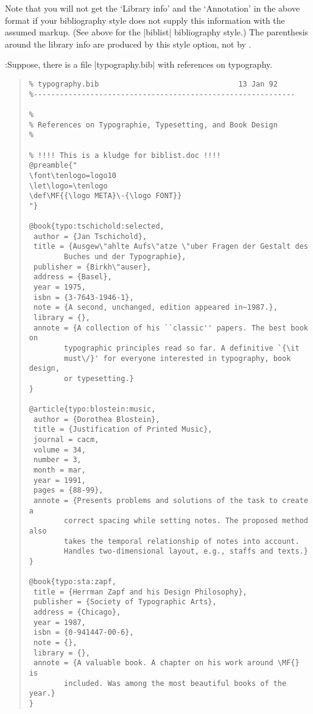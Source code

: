 Note that you will not get the `Library info' and the `Annotation' in
the above format if your bibliography style does not supply this
information with the assumed markup. (See above for the |biblist|
bibliography style.) The parenthesis around the library info are
produced by this style option, not by \BibTeX{}.


:\quad Suppose, there is a file |typography.bib|
with references on typography.
%
 \begin{quote}
\begin{verbatim}
% typography.bib                                13 Jan 92
%------------------------------------------------------------

%
% References on Typographie, Typesetting, and Book Design
%

% !!!! This is a kludge for biblist.doc !!!!
@preamble{"
\font\tenlogo=logo10
\let\logo=\tenlogo
\def\MF{{\logo META}\-{\logo FONT}}
"}

@book{typo:tschichold:selected,
 author = {Jan Tschichold},
 title = {Ausgew\"ahlte Aufs\"atze \"uber Fragen der Gestalt des
        Buches und der Typographie},
 publisher = {Birkh\"auser},
 address = {Basel},
 year = 1975,
 isbn = {3-7643-1946-1},
 note = {A second, unchanged, edition appeared in~1987.},
 library = {},
 annote = {A collection of his ``classic'' papers. The best book on
        typographic principles read so far. A definitive `{\it
        must\/}' for everyone interested in typography, book design,
        or typesetting.}
}

@article{typo:blostein:music,
 author = {Dorothea Blostein},
 title = {Justification of Printed Music},
 journal = cacm,
 volume = 34,
 number = 3,
 month = mar,
 year = 1991,
 pages = {88-99},
 annote = {Presents problems and solutions of the task to create a
        correct spacing while setting notes. The proposed method also
        takes the temporal relationship of notes into account.
        Handles two-dimensional layout, e.g., staffs and texts.}
}

@book{typo:sta:zapf,
 title = {Herrman Zapf and his Design Philosophy},
 publisher = {Society of Typographic Arts},
 address = {Chicago},
 year = 1987,
 isbn = {0-941447-00-6},
 note = {},
 library = {},
 annote = {A valuable book. A chapter on his work around \MF{} is
        included. Was among the most beautiful books of the year.}
}
\end{verbatim}
 \end{quote}
